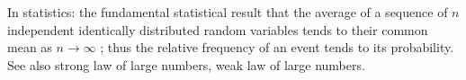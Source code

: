 In statistics: the fundamental statistical result that the average of a sequence of
 $ n $  independent identically distributed random variables tends to
their common mean as  $ n \to \infty  $ ; thus the relative frequency of an
event tends to its probability. See also strong law of large
numbers, weak law of large numbers.


